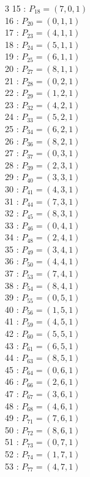 \documentclass{article}
\begin{document}
{\begin{multicols}{3}
15 : $P_{18}=( 7, 0, 1 )$\\
16 : $P_{20}=( 0, 1, 1 )$\\
17 : $P_{23}=( 4, 1, 1 )$\\
18 : $P_{24}=( 5, 1, 1 )$\\
19 : $P_{25}=( 6, 1, 1 )$\\
20 : $P_{27}=( 8, 1, 1 )$\\
21 : $P_{28}=( 0, 2, 1 )$\\
22 : $P_{29}=( 1, 2, 1 )$\\
23 : $P_{32}=( 4, 2, 1 )$\\
24 : $P_{33}=( 5, 2, 1 )$\\
25 : $P_{34}=( 6, 2, 1 )$\\
26 : $P_{36}=( 8, 2, 1 )$\\
27 : $P_{37}=( 0, 3, 1 )$\\
28 : $P_{39}=( 2, 3, 1 )$\\
29 : $P_{40}=( 3, 3, 1 )$\\
30 : $P_{41}=( 4, 3, 1 )$\\
31 : $P_{44}=( 7, 3, 1 )$\\
32 : $P_{45}=( 8, 3, 1 )$\\
33 : $P_{46}=( 0, 4, 1 )$\\
34 : $P_{48}=( 2, 4, 1 )$\\
35 : $P_{49}=( 3, 4, 1 )$\\
36 : $P_{50}=( 4, 4, 1 )$\\
37 : $P_{53}=( 7, 4, 1 )$\\
38 : $P_{54}=( 8, 4, 1 )$\\
39 : $P_{55}=( 0, 5, 1 )$\\
40 : $P_{56}=( 1, 5, 1 )$\\
41 : $P_{59}=( 4, 5, 1 )$\\
42 : $P_{60}=( 5, 5, 1 )$\\
43 : $P_{61}=( 6, 5, 1 )$\\
44 : $P_{63}=( 8, 5, 1 )$\\
45 : $P_{64}=( 0, 6, 1 )$\\
46 : $P_{66}=( 2, 6, 1 )$\\
47 : $P_{67}=( 3, 6, 1 )$\\
48 : $P_{68}=( 4, 6, 1 )$\\
49 : $P_{71}=( 7, 6, 1 )$\\
50 : $P_{72}=( 8, 6, 1 )$\\
51 : $P_{73}=( 0, 7, 1 )$\\
52 : $P_{74}=( 1, 7, 1 )$\\
53 : $P_{77}=( 4, 7, 1 )$\\

\end{multicols}}
\end{document}
